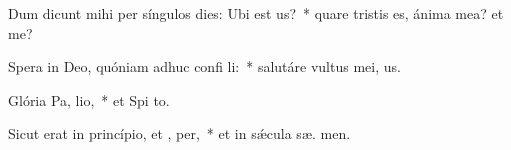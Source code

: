 \item Dum dicunt mihi per síngulos dies: Ubi est  us?~* quare tristis es, ánima mea? et   me?
\item Spera in Deo, quóniam adhuc confi li:~* salutáre vultus mei,   us.
\item Glória Pa,  lio,~* et Spi to.
\item Sicut erat in princípio, et ,  per,~* et in sǽcula sæ. men.

